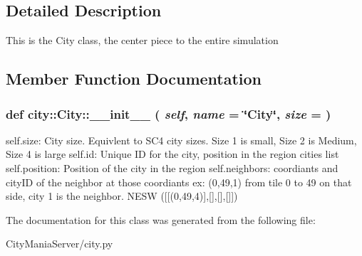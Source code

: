 \subsection{Detailed Description}
\begin{DoxyVerb}
This is the City class, the center piece to the entire simulation
\end{DoxyVerb}
 

\subsection{Member Function Documentation}
\hypertarget{classcity_1_1City_af66d86e522c54c232f0ee7e7df63e82e}{
\subsubsection[{\_\-\_\-init\_\-\_\-}]{\setlength{\rightskip}{0pt plus 5cm}def city::City::\_\-\_\-init\_\-\_\- ( {\em self}, \/   {\em name} = {\ttfamily \char`\"{}City\char`\"{}}, \/   {\em size} = {})}}
\label{classcity_1_1City_af66d86e522c54c232f0ee7e7df63e82e}
\begin{DoxyVerb}
self.size: City size.  Equivlent to SC4 city sizes.  Size 1 is small, Size 2 is Medium, Size 4 is large
self.id: Unique ID for the city, position in the region cities list
self.position:  Position of the city in the region
self.neighbors: coordiants and cityID of the neighbor at those coordiants
ex: (0,49,1) from tile 0 to 49 on that side, city 1 is the neighbor. NESW ([[(0,49,4)],[],[],[]])
\end{DoxyVerb}
 

The documentation for this class was generated from the following file:\begin{DoxyCompactItemize}
\item 
CityManiaServer/city.py\end{DoxyCompactItemize}
